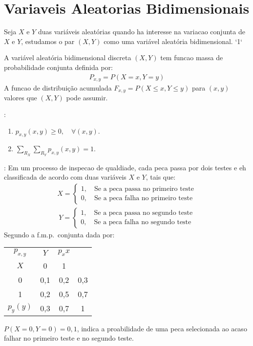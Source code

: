 \section{Variaveis Aleatorias Bidimensionais}
\begin{description}
  \item Seja $X$ e $Y$ duas variáveis aleatórias quando ha interesse na variacao conjunta de $X$ e $Y$, estudamos o par $(X,Y)$ como uma variável aleatória bidimensional. `1`
  \item  [Definição:] A variável aleatória bidimensional discreta $(X,Y)$ tem funcao massa de probabilidade conjunta definida por:
    \begin{align}
      P_{x,y}= P(X=x, Y=y)
    \end{align}
    A funcao de distribuição acumulada $F_{x,y} = P(X \leq x, Y \leq y)$ para $(x,y)$ valores que $(X,Y)$ pode assumir.
  \item [Propriedades]:
    \begin{enumerate}[label=(\alph*)]
      \item $p_{x,y}(x,y) \geq 0, \quad \forall (x,y)$.
      \item $\sum \limits_{R_X} \sum \limits_{R_Y} p_{x,y} (x,y) = 1$.
    \end{enumerate}
  \item [Exemplo]:
Em um processo de inspecao de qualdiade, cada peca passa por dois testes e eh classificada de acordo com duas variáveis $X$ e $Y$, tais que:
\begin{align*}
 X= \begin{cases}
   1,\quad \text{Se a peca passa no primeiro teste}  \\
   0, \quad \text{Se a peca falha no primeiro teste}
 \end{cases} 
\end{align*}
\begin{align*}
 Y= \begin{cases}
  1,\quad \text{Se a peca passa no segundo teste}  \\
0, \quad \text{Se a peca falha no segundo teste}
 \end{cases} 
\end{align*}
Segundo a f.m.p.\ conjunta dada por:
\begin{table}[H]
  \centering
  \label{tab:x}
  \begin{tabular}{c c c c}
    $    p_{x,y} $ & $Y$& $p_x{x}$ \\
    $ X$ & 0 &1  \\
    0 & 0,1&0,2&0,3 \\
    1 & 0,2& 0,5& 0,7\\
    $p_y(y)$  & 0,3&0,7&1
  \end{tabular}
\end{table}
$P(X=0, Y=0)=0,1$, indica a proabilidade de uma peca selecionada ao acaso falhar no primeiro teste e no segundo teste.
\end{description}
